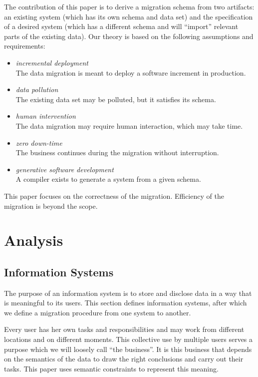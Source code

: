 \documentclass[runningheads]{llncs}
\begin{document}
   The contribution of this paper is to derive a migration schema from two artifacts: an existing system
   (which has its own schema and data set) and the specification of a desired system (which has a different schema and will ``import'' relevant parts of the existing data).   
   Our theory is based on the following assumptions and requirements:
\begin{itemize}
   \item {\em incremental deployment}\\The data migration is meant to deploy a software increment in production.
   \item {\em data pollution}\\The existing data set may be polluted, but it satisfies its schema.
   \item {\em human intervention}\\The data migration may require human interaction, which may take time.
   \item {\em zero down-time}\\The business continues during the migration without interruption.
   \item {\em generative software development}\\A compiler exists to generate a system from a given schema.
\end{itemize}
   This paper focuses on the correctness of the migration.
   Efficiency of the migration is beyond the scope.

\section{Analysis}
\label{sct:Analysis}
\subsection{Information Systems}
   The purpose of an information system is to store and disclose data in a way that is meaningful to its users.
   This section defines information systems, after which we define a migration procedure from one system to another.

   Every user has her own tasks and responsibilities and may work from different locations and on different moments.
   This collective use by multiple users serves a purpose which we will loosely call ``the business''.
   It is this business that depends on the semantics of the data to draw the right conclusions and carry out their tasks.
   This paper uses semantic constraints to represent this meaning.
   
\end{document}
